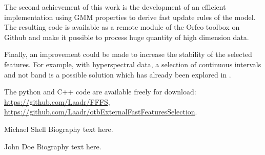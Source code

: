 \documentclass[journal,peerreview,onecolumn]{IEEEtran}
\begin{document}
The second achievement of this work is the development of an efficient implementation using GMM properties to derive fast update rules of the model. The resulting code is available as a remote module of the Orfeo toolbox on Github and make it possible to process huge quantity of high dimension data.

Finally, an improvement could be made to increase the stability of the selected features. For example, with hyperspectral data, a selection of continuous intervals and not band is a possible solution which has already been explored in \cite{serpico2007extraction}.

The python and C++ code are available freely for download: \url{https://github.com/Laadr/FFFS}, \url{https://github.com/Laadr/otbExternalFastFeaturesSelection}.







%

\begin{IEEEbiography}{Michael Shell}
Biography text here.
\end{IEEEbiography}

\begin{IEEEbiographynophoto}{John Doe}
Biography text here.
\end{IEEEbiographynophoto}

\end{document}
